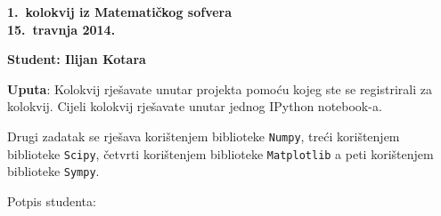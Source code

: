 \documentclass[a4paper,11pt]{article}
\begin{document}
\begin{center}
	{\LARGE \textbf{1.\ kolokvij iz Matematičkog sofvera}}\\
	{\Large\textbf{15.\ travnja 2014.}}\\
\end{center}

\begin{center}{\large \textbf{Student: Ilijan Kotara}}\end{center}

\begin{enumerate}





\end{enumerate}

\vspace{5mm}

\textbf{Uputa}: Kolokvij rješavate unutar projekta pomoću kojeg ste se registrirali za kolokvij. 
Cijeli kolokvij rješavate unutar jednog IPython notebook-a. 

Drugi zadatak se rješava korištenjem biblioteke \texttt{Numpy}, treći korištenjem biblioteke \texttt{Scipy}, četvrti korištenjem 
biblioteke \texttt{Matplotlib} a peti korištenjem biblioteke \texttt{Sympy}.

\vspace{5mm}

\begin{flushright}
Potpis studenta:	
\end{flushright}
	
\newpage
\end{document}
